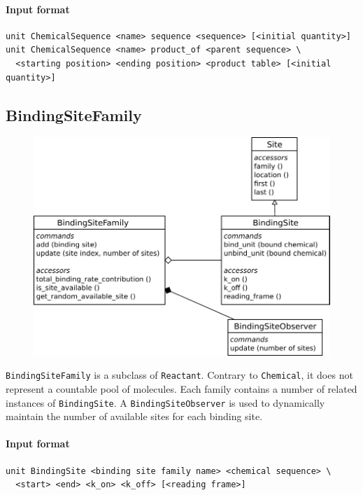 \documentclass[12pt]{article}
\theoremstyle{definition}
\theoremstyle{remark}
\numberwithin{equation}{section}
\begin{document}
\paragraph{Input format}
\begin{verbatim}
unit ChemicalSequence <name> sequence <sequence> [<initial quantity>]
unit ChemicalSequence <name> product_of <parent sequence> \
  <starting position> <ending position> <product table> [<initial quantity>]
\end{verbatim}

\subsection{BindingSiteFamily}

\begin{figure}[!ht]
	\centering
	\includegraphics[scale=0.8]{bindingsitefamily}
\end{figure}

\texttt{BindingSiteFamily} is a subclass of \texttt{Reactant}. Contrary to \texttt{Chemical}, it does not represent a countable pool of molecules. Each family contains a number of related instances of \texttt{BindingSite}. A \texttt{BindingSiteObserver} is used to dynamically maintain the number of available sites for each binding site.

\paragraph{Input format}
\begin{verbatim}
unit BindingSite <binding site family name> <chemical sequence> \
  <start> <end> <k_on> <k_off> [<reading frame>]
\end{verbatim}
\end{document}
